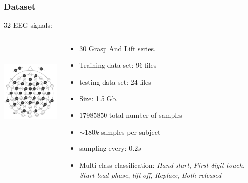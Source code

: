 \documentclass{beamer}
\begin{document}
\begin{frame}
\frametitle{Dataset}
32 EEG signals:
\begin{columns}[T]
\begin{column}{.5\textwidth}
\begin{center}
\includegraphics[height=2.0in]{EEG_Electrode_Numbering.jpg}
\end{center}
\end{column}
\begin{column}{.5\textwidth}
\begin{itemize} 
\item 30 Grasp And Lift series.
\item Training data set: 96 files
\item testing data set: 24 files
\item  Size: 1.5 Gb.
\item $17985850$ total number of samples
\item $\sim180k$ samples per subject
\item sampling every: $0.2 s$
\item Multi class classification: \textit{Hand start}, \textit{First digit touch}, \textit{Start load phase}, \textit{lift off}, \textit{Replace}, \textit{Both released}
\end{itemize}
\end{column}
\end{columns}
\end{frame}
\end{document}
